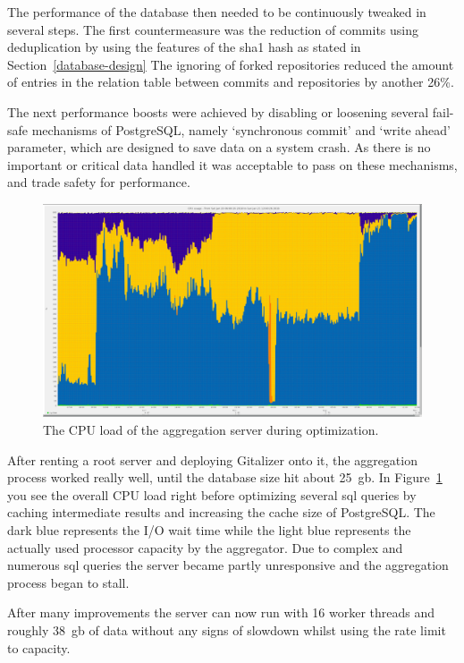 The performance of the database then needed to be continuously tweaked in several steps.
The first countermeasure was the reduction of commits using deduplication by using the features of the \ac{sha1} hash as stated in Section~\ref{database-design}
The ignoring of forked repositories reduced the amount of entries in the relation table between commits and repositories by another 26\%.

The next performance boosts were achieved by disabling or loosening several fail-safe mechanisms of PostgreSQL, namely `synchronous commit' and `write ahead' parameter, which are designed to save data on a system crash.
As there is no important or critical data handled it was acceptable to pass on these mechanisms, and trade safety for performance.

\begin{figure}[H]
\includegraphics[scale=0.22]{./graphs/server-graphs/query-refactoring}
\centering
\caption{The CPU load of the aggregation server during optimization.}\label{fig:cpu-load}
\end{figure}

After renting a root server and deploying Gitalizer onto it, the aggregation process worked really well, until the database size hit about 25~\ac{gb}.
In Figure~\ref{fig:cpu-load} you see the overall CPU load right before optimizing several \ac{sql} queries by caching intermediate results and increasing the cache size of PostgreSQL.
The dark blue represents the I/O wait time while the light blue represents the actually used processor capacity by the aggregator.
Due to complex and numerous \ac{sql} queries the server became partly unresponsive and the aggregation process began to stall.

After many improvements the server can now run with 16 worker threads and roughly 38~\ac{gb} of data without any signs of slowdown whilst using the rate limit to capacity.


